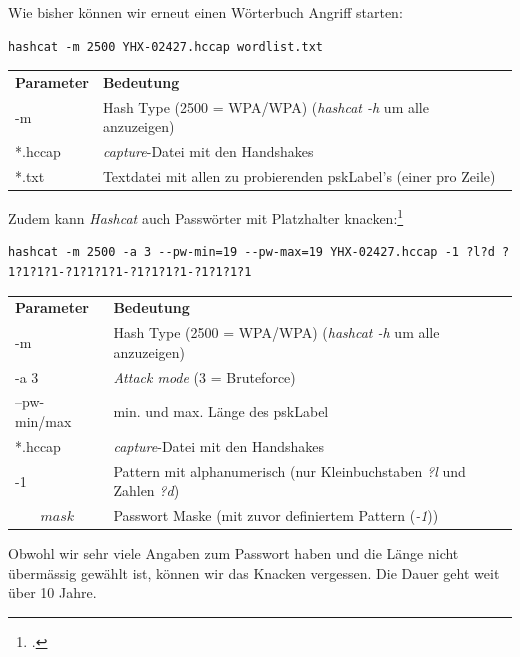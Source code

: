 Wie bisher können wir erneut einen Wörterbuch Angriff starten:
\begin{lstlisting}[style=lstStyleFramed]
hashcat -m 2500 YHX-02427.hccap wordlist.txt
\end{lstlisting}
\begin{tabular}{l l}
	\textbf{Parameter} & \textbf{Bedeutung}\\
	-m & Hash Type (2500 = WPA/WPA) (\textit{hashcat -h} um alle anzuzeigen)\\
	*.hccap & \textit{capture}-Datei mit den Handshakes\\
	*.txt & Textdatei mit allen zu probierenden \gls{pskLabel}'s (einer pro Zeile)\\
\end{tabular}

Zudem kann \textit{Hashcat} auch Passwörter mit Platzhalter knacken:\footcite{mask_attack_hashcat_wiki_2015-04-13}
\begin{lstlisting}[style=lstStyleFramed]
hashcat -m 2500 -a 3 --pw-min=19 --pw-max=19 YHX-02427.hccap -1 ?l?d ?1?1?1?1-?1?1?1?1-?1?1?1?1-?1?1?1?1
\end{lstlisting}
\begin{tabular}{l l}
	\textbf{Parameter} & \textbf{Bedeutung}\\
	-m & Hash Type (2500 = WPA/WPA) (\textit{hashcat -h} um alle anzuzeigen)\\
	-a 3 & \textit{Attack mode} (3 = Bruteforce)\\
	--pw-min/max & min. und max. Länge des \gls{pskLabel}\\
	*.hccap & \textit{capture}-Datei mit den Handshakes\\
	-1 & Pattern mit alphanumerisch (nur Kleinbuchstaben \textit{?l} und Zahlen \textit{?d})\\
	\[mask\] & Passwort Maske (mit zuvor definiertem Pattern (\textit{-1}))\\
\end{tabular}
Obwohl wir sehr viele Angaben zum Passwort haben und die Länge nicht übermässig gewählt ist, können wir das Knacken vergessen.
Die Dauer geht weit über 10 Jahre.




